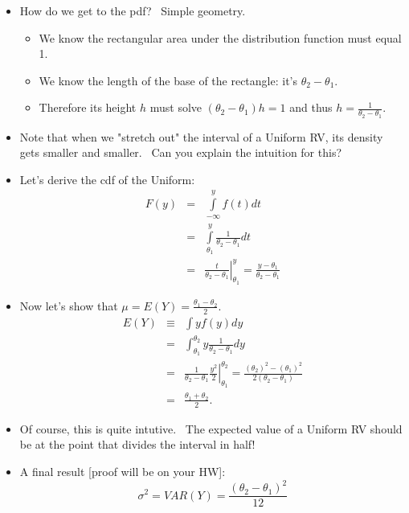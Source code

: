 \documentclass[11pt]{article}
\begin{document}
\begin{itemize}
\item How do we get to the pdf? \ Simple geometry. \ 

\begin{itemize}
\item We know the rectangular area under the distribution function must
equal 1.

\item We know the length of the base of the rectangle: it's $\theta
_{2}-\theta _{1}.$

\item Therefore its height $h$ must solve  $\left( \theta _{2}-\theta
_{1}\right) h=1$ and thus $h=\frac{1}{\theta _{2}-\theta _{1}}.$
\end{itemize}

\item Note that when we "stretch out" the interval of a Uniform RV, its
density gets smaller and smaller. \ Can you explain the intuition for this?

\item Let's derive the cdf of the Uniform:%
\begin{eqnarray*}
F\left( y\right)  &=&\int\limits_{-\infty }^{y}f(t)dt \\
&=&\int\limits_{\theta _{1}}^{y}\frac{1}{\theta _{2}-\theta _{1}}dt \\
&=&\left. \frac{t}{\theta _{2}-\theta _{1}}\right\vert _{\theta _{1}}^{y}=%
\frac{y-\theta _{1}}{\theta _{2}-\theta _{1}}
\end{eqnarray*}

\item Now let's show that $\mu =E\left( Y\right) =\frac{\theta _{1}-\theta
_{2}}{2}.$%
\begin{eqnarray*}
E\left( Y\right)  &\equiv &\int yf\left( y\right) dy \\
&=&\int_{\theta _{1}}^{\theta _{2}}y\frac{1}{\theta _{2}-\theta _{1}}dy \\
&=&\frac{1}{\theta _{2}-\theta _{1}}\left. \frac{y^{2}}{2}\right\vert
_{\theta _{1}}^{\theta _{2}}=\frac{\left( \theta _{2}\right) ^{2}-\left(
\theta _{1}\right) ^{2}}{2\left( \theta _{2}-\theta _{1}\right) } \\
&=&\frac{\theta _{1}+\theta _{2}}{2}.
\end{eqnarray*}

\item Of course, this is quite intutive. \ The expected value of a Uniform
RV should be at the point that divides the interval in half!

\item A final result [proof will be on your HW]: 
\begin{equation*}
\sigma ^{2}=VAR(Y)=\frac{\left( \theta _{2}-\theta _{1}\right) ^{2}}{12}
\end{equation*}


\end{itemize}
\end{document}
